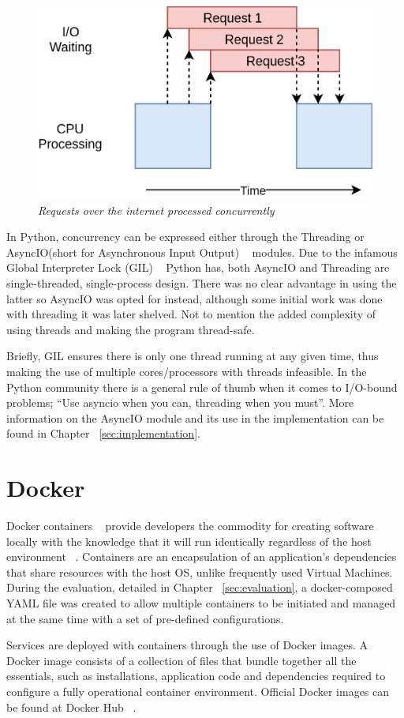 \begin{figure}[ht]
 \centering
 \includegraphics[width=\linewidth]{figures/concurrency_example.png}
 \caption[Requests over the internet processed concurrently]{\textit{Requests over the internet processed concurrently} ~\cite{concurrency_realpython}}
 \label{fig:concurrency_example}
\end{figure}

In Python, concurrency can be expressed either through the Threading or AsyncIO(short for Asynchronous Input Output) ~\cite{asyncio} modules. Due to the infamous Global Interpreter Lock (GIL) ~\cite{gil_realpython} Python has, both AsyncIO and Threading are single-threaded, single-process design. There was no clear advantage in using the latter so AsyncIO was opted for instead, although some initial work was done with threading it was later shelved. Not to mention the added complexity of using threads and making the program thread-safe. 

Briefly, GIL ensures there is only one thread running at any given time, thus making the use of multiple cores/processors with threads infeasible. In the Python community there is a general rule of thumb when it comes to I/O-bound problems; “Use asyncio when you can, threading when you must”. More information on the AsyncIO module and its use in the \pname implementation can be found in Chapter ~\ref{sec:implementation}.

\section{Docker}
Docker containers ~\cite{docker_containers} provide developers the commodity for creating software locally with the knowledge that it will run identically regardless of the host environment ~\cite{using_docker_book}. Containers are an encapsulation of an application's dependencies that share resources with the host OS, unlike frequently used Virtual Machines. During the evaluation, detailed in Chapter ~\ref{sec:evaluation}, a docker-composed YAML file was created to allow multiple containers to be initiated and managed at the same time with a set of pre-defined configurations. 

Services are deployed with containers through the use of Docker images. A Docker image consists of a collection of files that bundle together all the essentials, such as installations, application code and dependencies required to configure a fully operational container environment. Official Docker images can be found at Docker Hub ~\cite{docker_hub}.